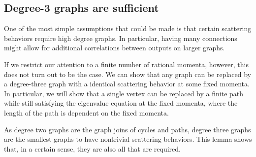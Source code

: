 \documentclass[../thesis-main/thesis-main]{subfiles}
\begin{document}
\subsection{Degree-3 graphs are sufficient}

One of the most simple assumptions that could be made is that certain scattering behaviors require high degree graphs.  In particular, having many connections might allow for additional correlations between outputs on larger graphs.  

If we restrict our attention to a finite number of rational momenta, however, this does not turn out to be the case.  We can show that any graph can be replaced by a degree-three graph with a identical scattering behavior at some fixed momenta.  In particular, we will show that a single vertex can be replaced by a finite path while still satisfying the eigenvalue equation at the fixed momenta, where the length of the path is dependent on the fixed momenta.

As degree two graphs are the graph joins of cycles and paths, degree three graphs are the smallest graphs to have nontrivial scattering behaviors.  This lemma shows that, in a certain sense, they are also all that are required.
\end{document}
